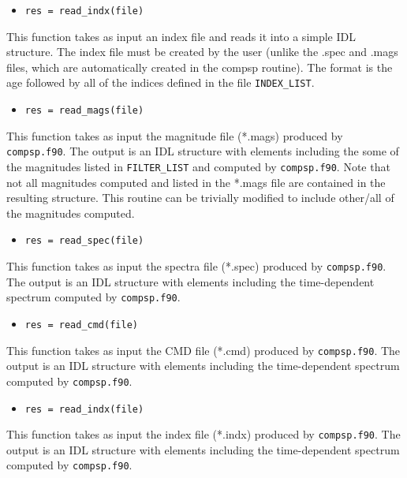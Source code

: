 \documentclass[]{article}
\begin{document}
\begin{itemize}
\item \texttt{res = read\_indx(file)}
\end{itemize}

This function takes as input an index file and reads it into a simple IDL
structure.  The index file must be created by the user (unlike the .spec and
.mags files, which are automatically created in the compsp routine).  The format
is the age followed by all of the indices defined in the file
\texttt{INDEX\_LIST}.

\begin{itemize}
\item \texttt{res = read\_mags(file)}
\end{itemize}

This function takes as input the magnitude file (*.mags) produced by
\texttt{compsp.f90}.  The output is an IDL structure with elements including the
some of the magnitudes listed in \texttt{FILTER\_LIST} and computed by
\texttt{compsp.f90}.  Note that not all magnitudes computed and listed in the
*.mags file are contained in the resulting structure.  This routine can be
trivially modified to include other/all of the magnitudes computed.

\begin{itemize}
\item \texttt{res = read\_spec(file)}
\end{itemize}

This function takes as input the spectra file (*.spec) produced by
\texttt{compsp.f90}.  The output is an IDL structure with elements including the
time-dependent spectrum computed by \texttt{compsp.f90}.

\begin{itemize}
\item \texttt{res = read\_cmd(file)}
\end{itemize}

This function takes as input the CMD file (*.cmd) produced by
\texttt{compsp.f90}.  The output is an IDL structure with elements including the
time-dependent spectrum computed by \texttt{compsp.f90}.

\begin{itemize}
\item \texttt{res = read\_indx(file)}
\end{itemize}

This function takes as input the index file (*.indx) produced by
\texttt{compsp.f90}.  The output is an IDL structure with elements including the
time-dependent spectrum computed by \texttt{compsp.f90}.
\end{document}
